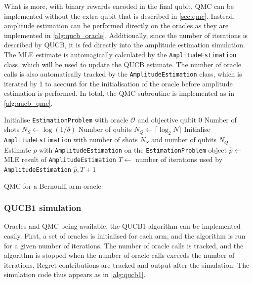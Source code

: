What is more, with binary rewards encoded in the final qubit, QMC can be implemented without the extra qubit that is described in \cref{sec:qmc}.
Instead, amplitude estimation can be performed directly on the oracles as they are implemented in \cref{alg:qucb_oracle}.
Additionally, since the number of iterations is described by QUCB, it is fed directly into the amplitude estimation simulation.
The MLE estimate is automagically calculated by the \texttt{AmplitudeEstimation} class, which will be used to update the QUCB estimate.
The number of oracle calls is also automatically tracked by the \texttt{AmplitudeEstimation} class, which is iterated by 1 to account for the initialisation of the oracle before amplitude estimation is performed.
In total, the QMC subroutine is implemented as in \cref{alg:qucb_qmc}.

\begin{algorithm}
    \SetAlgoLined
    Initialise \texttt{EstimationProblem} with oracle $\mathcal{O}$ and objective qubit 0 \;
    Number of shots $N_S \leftarrow \log(1 / \delta)$ \;
    Number of qubits $N_Q \leftarrow \lceil \log_2 N \rceil$ \;
    Initialise \texttt{AmplitudeEstimation} with number of shots $N_S$ and number of qubits $N_Q$ \;
    Estimate $p$ with \texttt{AmplitudeEstimation} on the \texttt{EstimationProblem} object \;
    $\hat{p} \leftarrow$ MLE result of \texttt{AmplitudeEstimation} \;
    $T \leftarrow$ number of iterations used by \texttt{AmplitudeEstimation} \;
    \Return $\hat{p}, T + 1$
    \caption{QMC for a Bernoulli arm oracle}
    \label{alg:qucb_qmc}
\end{algorithm}

\subsubsection{QUCB1 simulation}
Oracles and QMC being available, the QUCB1 algorithm can be implemented easily.
First, a set of oracles is initialised for each arm, and the algorithm is run for a given number of iterations.
The number of oracle calls is tracked, and the algorithm is stopped when the number of oracle calls exceeds the number of iterations.
Regret contributions are tracked and output after the simulation.
The simulation code thus appears as in \cref{alg:qucb1}.

